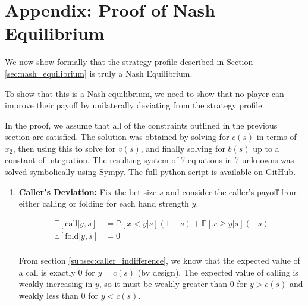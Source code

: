 \documentclass[../../main/main.tex]{subfiles}
\begin{document}
\section{Appendix: Proof of Nash Equilibrium}
\label{app:nash_equilibrium}

We now show formally that the strategy profile described in Section \ref{sec:nash_equilibrium} is truly a Nash Equilibrium.

\begin{customproof}
    To show that this is a Nash equilibrium, we need to show that no player can improve their payoff by unilaterally deviating from the strategy profile.
    
    In the proof, we assume that all of the constraints outlined in the previous section are satisfied. The solution was obtained by solving for $c(s)$ in terms of $x_2$, then using this to solve for $v(s)$, and finally solving for $b(s)$ up to a constant of integration. The resulting system of 7 equations in 7 unknowns was solved symbolically using Sympy. The full python script is available \href{https://github.com/andrew-spears/poker_variant_analysis/blob/main/notebooks/limit_continuous_poker/solve_sympy_final.ipynb}{on GitHub}.

    \begin{enumerate}
        \item \textbf{Caller's Deviation:}
            Fix the bet size $s$ and consider the caller's payoff from either calling or folding for each hand strength $y$. 

            \begin{align*}
                \mathbb{E}[\text{call} | y, s] &= \mathbb{P}[x < y | s](1+s) + \mathbb{P}[x \geq y | s](-s) \\
                \mathbb{E}[\text{fold} | y, s] &= 0 \\
            \end{align*}
            
            From section \ref{subsec:caller_indifference}, we know that the expected value of a call is exactly 0 for $y = c(s)$ (by design). The expected value of calling is weakly increasing in $y$, so it must be weakly greater than 0 for $y > c(s)$ and weakly less than 0 for $y < c(s)$. 

            \begin{figure}[h]
                \centering
\end{figure}
\end{enumerate}
\end{customproof}
\end{document}
